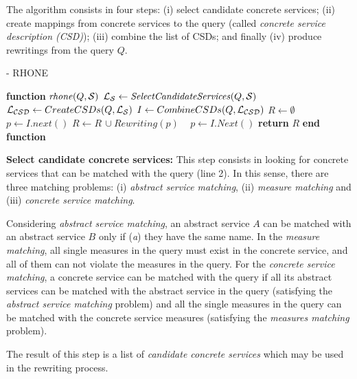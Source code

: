 The algorithm consists in four steps: (i) select candidate concrete services; (ii)
create mappings from concrete services to the query (called \textit{concrete
service description (CSD)}); (iii) combine the list of CSDs; and finally (iv)
produce rewritings from the query $Q$.


\begin{algorithm}
\caption{ - RHONE}
\label{algo-rhone}

\begin{algorithmic}[1]
 
\STATE \textbf{function} $\mathit{rhone} (Q, \bigS)$
 \STATE  $\bigLS \leftarrow \mathit{SelectCandidateServices}(Q, \bigS)$ \label{rhone:buildPCD}
 \STATE  $\bigLCSD \leftarrow CreateCSDs(Q, \bigLS)$
 \STATE  $I \leftarrow CombineCSDs(Q, \bigLCSD)$
 \STATE $R\leftarrow \emptyset$
    \STATE $p \leftarrow I.next()$
  \STATE $R\leftarrow R\,\cup \mathit{Rewriting}(p)$
  \STATE ~\!
   \ENDIF
      \STATE $p \leftarrow I.\mathit{Next}()$
 \ENDWHILE
    \STATE \textbf{return} $R$
\STATE \textbf{end function}

\end{algorithmic}

\end{algorithm}


\noindent \textbf{Select candidate concrete services:} This step consists in
 looking for concrete services that can be matched with the query (line 2). In
 this sense, there are three matching problems: (i) \textit{abstract service
 matching}, (ii) \textit{measure matching} and (iii) \textit{concrete service
 matching}.
 
 Considering \textit{abstract service matching}, an abstract service $A$ can be
 matched with an abstract service $B$ only if (\textit{a}) they have the same
 name.  In the \textit{measure matching}, all single measures in the query must
 exist in the concrete service, and all of them can not violate the measures in
 the query. For the \textit{concrete service matching}, a concrete service can
 be matched with the query if all its abstract services can be matched with the
 abstract service in the query (satisfying the \textit{abstract service
 matching} problem) and all the single measures in the query can be matched with
 the concrete service measures (satisfying the \textit{measures matching} problem).


The result of this step is a list of \textit{candidate concrete services} which
 may be used in the rewriting process.


